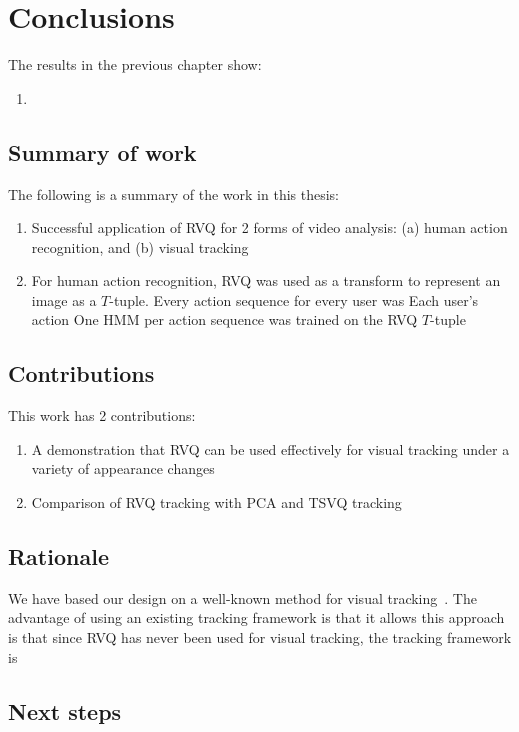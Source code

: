 \chapter{Conclusions}
\label{chap_conclusions}	
The results in the previous chapter show:

\begin{enumerate}
\item 
\end{enumerate}

\section{Summary of work}
The following is a summary of the work in this thesis:

\begin{enumerate}
\item Successful application of RVQ for 2 forms of video analysis: (a) human action recognition, and (b) visual tracking
\item For human action recognition, RVQ was used as a transform to represent an image as a $T$-tuple.  Every action sequence for every user was Each user's action One HMM per action sequence was trained on the RVQ $T$-tuple
\end{enumerate}
\section{Contributions}
This work has 2 contributions:

\begin{enumerate}
\item A demonstration that RVQ can be used effectively for visual tracking under a variety of appearance changes
\item Comparison of RVQ tracking with PCA and TSVQ tracking
\end{enumerate} 

\section{Rationale}
We have based our design on a well-known method for visual tracking~\cite{2008_JNL_subspaceTRK_Ross}.  The advantage of using an existing tracking framework is that it allows this approach is that since RVQ has never been used for visual tracking, the tracking framework is 
\section{Next steps}
